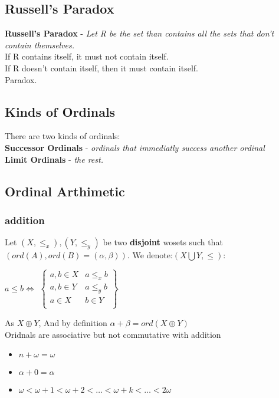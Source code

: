\documentclass{article}
\begin{document}
\subsection{Russell's Paradox}
	\textbf{Russell's Paradox} - \emph{Let R be the set than contains all the sets that don't contain themselves.}\\
    If R contains itself, it must not contain itself.\\
    If R doesn't contain itself, then it must contain itself.\\ Paradox.
\subsection{Kinds of Ordinals}
    There are two kinds of ordinals:\\
    \textbf{Successor Ordinals} - \emph{ordinals that immediatly success another ordinal}\\
    \textbf{Limit Ordinals} - \emph{the rest.}

\subsection{Ordinal Arthimetic}
\subsubsection{addition}
Let $(X,\le_x),(Y,\le_y)$ be two \textbf{disjoint} wosets such that $(ord(A),ord(B)=(\alpha,\beta))$. We denote:$(X\bigcup Y,\le)$:
\begin{center}$a\le b \iff$ $\begin{Bmatrix}
	a,b\in X & a\le_x b\\
	a,b\in Y & a\le_y b\\
	a\in X & b\in Y\\
\end{Bmatrix}$
\end{center}
As $X\oplus Y$, And by definition $\alpha+\beta=ord(X\oplus Y)$\\
Oridnals are associative but not commutative with addition
\begin{itemize}
\item $n+\omega=\omega$
\item $\alpha+0=\alpha$
\item $\omega<\omega+1<\omega+2<\ldots<\omega+k<\ldots<2\omega$
\end{itemize}
\end{document}
